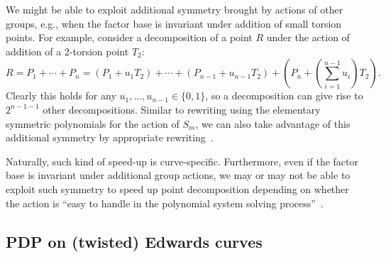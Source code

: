 We might be able to exploit additional symmetry brought by actions of
other groups, e.g., when the factor base is invariant under addition
of small torsion points.
%
For example, consider a decomposition of a point $R$ under the action
of addition of a 2-torsion point $T_2$:
\[ R = P_1+\cdots+P_n =
  (P_1+u_1T_2)+\cdots+(P_{n-1}+u_{n-1}T_2)+\left(P_n+\left(\sum_{i=1}^{n-1}u_i\right)T_2\right). \]
%
Clearly this holds for any $u_1,\ldots,u_{n-1}\in\{0,1\}$, so a
decomposition can give rise to $2^{n-1-1}$ other decompositions.
%
Similar to rewriting using the elementary symmetric polynomials for
the action of $S_m$, we can also take advantage of this additional
symmetry by appropriate
rewriting~\cite{DBLP:journals/joc/FaugereGHR14}.

Naturally, such kind of speed-up is curve-specific.
%
Furthermore, even if the factor base is invariant under additional
group actions, we may or may not be able to exploit such symmetry to
speed up point decomposition depending on whether the action is ``easy
to handle in the polynomial system solving
process''~\cite{DBLP:journals/joc/FaugereGHR14}.


\subsection{PDP on (twisted) Edwards curves}
\label{sec:twisted-edwards}



